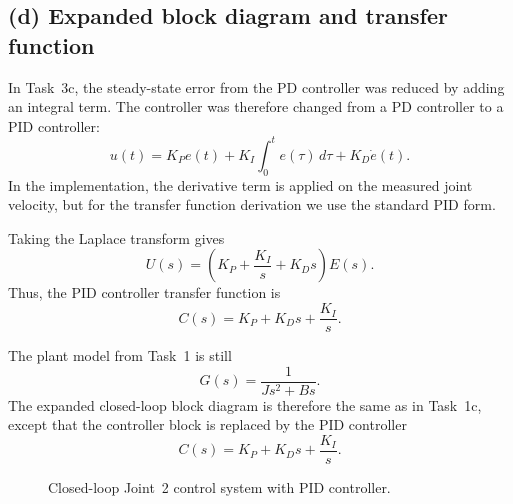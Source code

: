 \documentclass{article}
\begin{document}
\subsection*{(d) Expanded block diagram and transfer function}

In Task~3c, the steady-state error from the PD controller was reduced by adding an integral term. The controller was therefore changed from a PD controller to a PID controller:
\begin{equation}
    u(t)
    =
    K_P e(t)
    +
    K_I \int_0^t e(\tau)\,d\tau
    +
    K_D \dot e(t).
\end{equation}
In the implementation, the derivative term is applied on the measured joint velocity, but for the transfer function derivation we use the standard PID form.

Taking the Laplace transform gives
\begin{equation}
    U(s)
    =
    \left(
    K_P
    +
    \frac{K_I}{s}
    +
    K_Ds
    \right)E(s).
\end{equation}
Thus, the PID controller transfer function is
\begin{equation}
    C(s)
    =
    K_P
    +
    K_Ds
    +
    \frac{K_I}{s}.
\end{equation}

The plant model from Task~1 is still
\begin{equation}
    G(s)
    =
    \frac{1}{Js^2+Bs}.
\end{equation}
The expanded closed-loop block diagram is therefore the same as in Task~1c, except that the controller block is replaced by the PID controller
\[
    C(s)=K_P+K_Ds+\frac{K_I}{s}.
\]

\begin{figure}[H]
    \centering
    \caption{Closed-loop Joint~2 control system with PID controller.}
    \label{fig:closed_loop_pid}
\end{figure}
\end{document}

